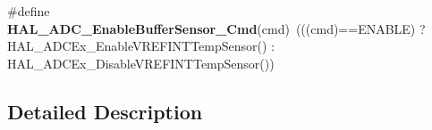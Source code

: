 \begin{DoxyCompactItemize}
\item 
\hypertarget{group___h_a_l___aliased___functions_ga674bce235a7be59ff19cca605b2e3ce8}{\#define {\bfseries H\-A\-L\-\_\-\-A\-D\-C\-\_\-\-Enable\-Buffer\-Sensor\-\_\-\-Cmd}(cmd)~(((cmd)==E\-N\-A\-B\-L\-E) ?  H\-A\-L\-\_\-\-A\-D\-C\-Ex\-\_\-\-Enable\-V\-R\-E\-F\-I\-N\-T\-Temp\-Sensor() \-: H\-A\-L\-\_\-\-A\-D\-C\-Ex\-\_\-\-Disable\-V\-R\-E\-F\-I\-N\-T\-Temp\-Sensor())}\label{group___h_a_l___aliased___functions_ga674bce235a7be59ff19cca605b2e3ce8}

\end{DoxyCompactItemize}


\subsection{Detailed Description}
